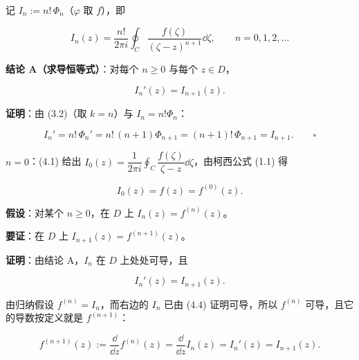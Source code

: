 \documentclass[11pt]{ctexart}
\let\origsubhdr\subhdr
\renewcommand{\subhdr}[1]{\par\origsubhdr{#1}}
\begin{document}


记 $I_n:=n!\,\Phi_n$（$\varphi$ 取 $f$），即

\begin{equation}
I_n(z)=\frac{n!}{2\pi i}\oint_C\frac{f(\zeta)}{(\zeta-z)^{n+1}}\dd\zeta ,
\qquad n=0,1,2,\dots
\tag{4.1}
\end{equation}

\textbf{结论 A（求导恒等式）}：对每个 $n\ge0$ 与每个 $z\in D$，

\begin{equation}
I_n'(z)=I_{n+1}(z).
\tag{4.2}
\end{equation}

\textbf{证明}：由 (3.2)（取 $k=n$）与 $I_n=n!\Phi_n$：

\begin{equation*}
I_n'=n!\,\Phi_n'=n!\,(n+1)\Phi_{n+1}=(n+1)!\,\Phi_{n+1}=I_{n+1}. \qquad\square
\end{equation*}



$n=0$：(4.1) 给出 $I_0(z)=\dfrac{1}{2\pi i}\displaystyle\oint_C\dfrac{f(\zeta)}{\zeta-z}\dd\zeta$，由柯西公式 (1.1) 得

\begin{equation}
I_0(z)=f(z)=f^{(0)}(z).
\tag{4.3}
\end{equation}


\textbf{假设}：对某个 $n\ge0$，在 $D$ 上 $I_n(z)=f^{(n)}(z)$。

\textbf{要证}：在 $D$ 上 $I_{n+1}(z)=f^{(n+1)}(z)$。

\textbf{证明}：由结论 A，$I_n$ 在 $D$ 上处处可导，且

\begin{equation}
I_n'(z)=I_{n+1}(z).
\tag{4.4}
\end{equation}

由归纳假设 $f^{(n)}=I_n$，而右边的 $I_n$ 已由 (4.4) 证明可导，所以 $f^{(n)}$ 可导，且它的导数按定义就是 $f^{(n+1)}$：

\begin{equation}
f^{(n+1)}(z):=\frac{\dd}{\dd z}f^{(n)}(z)=\frac{\dd}{\dd z}I_n(z)=I_n'(z)=I_{n+1}(z).
\tag{4.5}
\end{equation}
\end{document}
